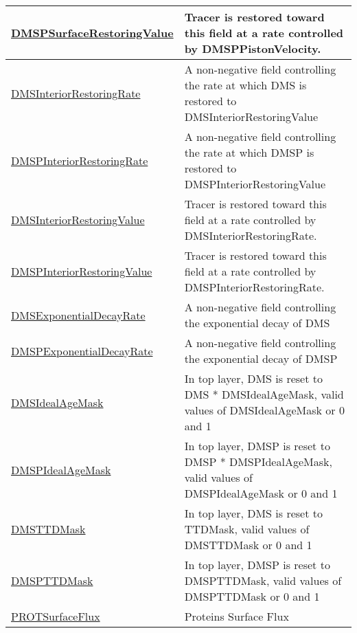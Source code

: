 {\begin{center}
\begin{longtable}{| p{2.0in} | p{4.0in} |}
    \hline
    \hyperref[subsec:var_sec_forcing_DMSPSurfaceRestoringValue]{DMSPSurfaceRestoringValue} & Tracer is restored toward this field at a rate controlled by DMSPPistonVelocity. \\
    \hline
    \hyperref[subsec:var_sec_forcing_DMSInteriorRestoringRate]{DMSInteriorRestoringRate} & A non-negative field controlling the rate at which DMS is restored to DMSInteriorRestoringValue \\
    \hline
    \hyperref[subsec:var_sec_forcing_DMSPInteriorRestoringRate]{DMSPInteriorRestoringRate} & A non-negative field controlling the rate at which DMSP is restored to DMSPInteriorRestoringValue \\
    \hline
    \hyperref[subsec:var_sec_forcing_DMSInteriorRestoringValue]{DMSInteriorRestoringValue} & Tracer is restored toward this field at a rate controlled by DMSInteriorRestoringRate. \\
    \hline
    \hyperref[subsec:var_sec_forcing_DMSPInteriorRestoringValue]{DMSPInteriorRestoringValue} & Tracer is restored toward this field at a rate controlled by DMSPInteriorRestoringRate. \\
    \hline
    \hyperref[subsec:var_sec_forcing_DMSExponentialDecayRate]{DMSExponentialDecayRate} & A non-negative field controlling the exponential decay of DMS \\
    \hline
    \hyperref[subsec:var_sec_forcing_DMSPExponentialDecayRate]{DMSPExponentialDecayRate} & A non-negative field controlling the exponential decay of DMSP \\
    \hline
    \hyperref[subsec:var_sec_forcing_DMSIdealAgeMask]{DMSIdealAgeMask} & In top layer, DMS is reset to DMS * DMSIdealAgeMask, valid values of DMSIdealAgeMask or 0 and 1 \\
    \hline
    \hyperref[subsec:var_sec_forcing_DMSPIdealAgeMask]{DMSPIdealAgeMask} & In top layer, DMSP is reset to DMSP * DMSPIdealAgeMask, valid values of DMSPIdealAgeMask or 0 and 1 \\
    \hline
    \hyperref[subsec:var_sec_forcing_DMSTTDMask]{DMSTTDMask} & In top layer, DMS is reset to TTDMask, valid values of DMSTTDMask or 0 and 1 \\
    \hline
    \hyperref[subsec:var_sec_forcing_DMSPTTDMask]{DMSPTTDMask} & In top layer, DMSP is reset to DMSPTTDMask, valid values of DMSPTTDMask or 0 and 1 \\
    \hline
    \hyperref[subsec:var_sec_forcing_PROTSurfaceFlux]{PROTSurfaceFlux} & Proteins Surface Flux \\
    \hline

\end{longtable}
\end{center}}
